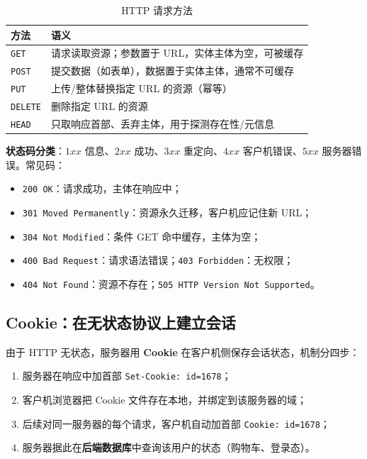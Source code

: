 \begin{table}[H]
\centering
\caption{HTTP 请求方法}
\begin{tabulary}{\textwidth}{@{}LL@{}}
\toprule
\textbf{方法} & \textbf{语义} \\
\midrule
\texttt{GET} & 请求读取资源；参数置于 URL，实体主体为空，可被缓存 \\
\texttt{POST} & 提交数据（如表单），数据置于实体主体，通常不可缓存 \\
\texttt{PUT} & 上传/整体替换指定 URL 的资源（幂等） \\
\texttt{DELETE} & 删除指定 URL 的资源 \\
\texttt{HEAD} & 只取响应首部、丢弃主体，用于探测存在性/元信息 \\
\bottomrule
\end{tabulary}
\end{table}

\textbf{状态码分类}：$1xx$ 信息、$2xx$ 成功、$3xx$ 重定向、$4xx$ 客户机错误、$5xx$ 服务器错误。常见码：

\begin{itemize}
    \item \texttt{200 OK}：请求成功，主体在响应中；
    \item \texttt{301 Moved Permanently}：资源永久迁移，客户机应记住新 URL；
    \item \texttt{304 Not Modified}：条件 GET 命中缓存，主体为空；
    \item \texttt{400 Bad Request}：请求语法错误；\texttt{403 Forbidden}：无权限；
    \item \texttt{404 Not Found}：资源不存在；\texttt{505 HTTP Version Not Supported}。
\end{itemize}

\subsection{Cookie：在无状态协议上建立会话}

由于 HTTP 无状态，服务器用 \textbf{Cookie} 在客户机侧保存会话状态，机制分四步：

\begin{enumerate}
    \item 服务器在响应中加首部 \texttt{Set-Cookie: id=1678}；
    \item 客户机浏览器把 Cookie 文件存在本地，并绑定到该服务器的域；
    \item 后续对同一服务器的每个请求，客户机自动加首部 \texttt{Cookie: id=1678}；
    \item 服务器据此在\textbf{后端数据库}中查询该用户的状态（购物车、登录态）。
\end{enumerate}

